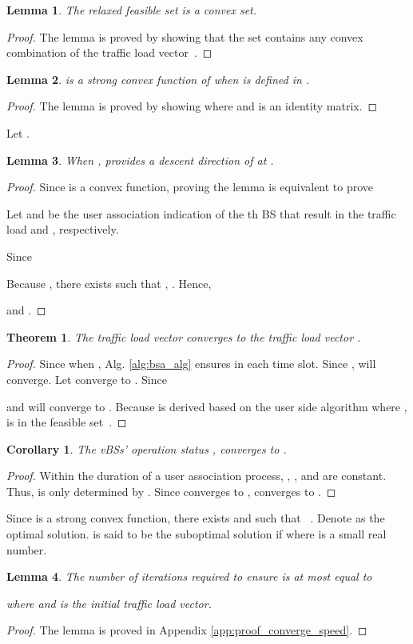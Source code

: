 \documentclass[journal]{IEEEtran}
\newtheorem{theorem}{Theorem}
\newtheorem{lemma}{Lemma}
\newtheorem{corollary}{Corollary}
\theoremstyle{definition}
\begin{document}
\begin{lemma}
\label{thm:feasible_set}
The relaxed feasible set  is a convex set.
\end{lemma}
\begin{proof}
The lemma is proved by showing that the set  contains any convex combination of the traffic load vector~.
\end{proof}
\begin{lemma}
\label{thm:convexity}
 is a strong convex function of  when  is defined in .
\end{lemma}
\begin{proof}
\label{prf:cvx}
The lemma is proved by showing  where  and  is an identity matrix.
\end{proof}
Let .
\begin{lemma}
\label{thm:descent_direction}
When ,  provides a descent direction of  at .
\end{lemma}
\begin{proof}
\label{prf:descent_direction}
Since  is a convex function, proving the lemma is equivalent to prove

Let  and  be the user association indication of the th BS that result in the traffic load  and , respectively.

Since



Because , there exists  such that , . Hence,

and .
\end{proof}
\begin{theorem}
\label{thm:alg_converge_thm}
The traffic load vector  converges to the traffic load vector .
\end{theorem}
\begin{proof}
\label{prf:alg_converge_thm}
Since  when , Alg. \ref{alg:bsa_alg} ensures  in each time slot. Since ,  will converge. Let  converge to . Since

 and  will converge to . Because  is derived based on the user side algorithm where ,  is in the feasible set~.
\end{proof}

\begin{corollary}
\label{thm:alg_converge_col}
The vBSs' operation status , converges to .
\end{corollary}
\begin{proof}
Within the duration of a user association process, , , and  are constant. Thus,  is only determined by . Since  converges to ,  converges to .
\end{proof}
Since  is a strong convex function, there exists  and  such that ~\cite{Boyd:2004:CVX}. Denote  as the optimal solution.  is said to be the  suboptimal solution if  where  is a small real number.
\begin{lemma}
\label{thm:converge_speed}
The number of iterations required to ensure  is at most equal to

where  and  is the initial traffic load vector.
\end{lemma}
\begin{proof}
The lemma is proved in Appendix \ref{app:proof_converge_speed}.
\end{proof}
\end{document}
